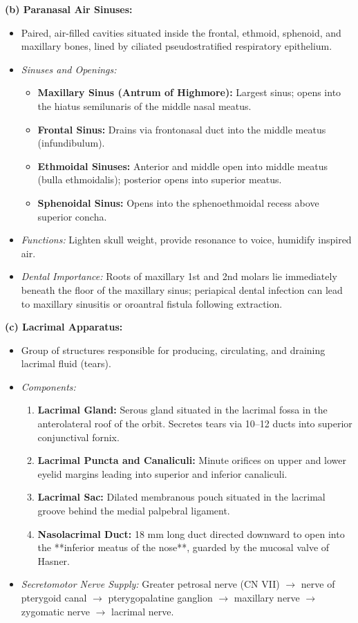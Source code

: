 \documentclass[11pt,a4paper]{article}
\begin{document}
\begin{ansbox}
\textbf{(b) Paranasal Air Sinuses:}
\begin{itemize}[leftmargin=*]
    \item Paired, air-filled cavities situated inside the frontal, ethmoid, sphenoid, and maxillary bones, lined by ciliated pseudostratified respiratory epithelium.
    \item \textit{Sinuses and Openings:}
    \begin{itemize}
        \item \textbf{Maxillary Sinus (Antrum of Highmore):} Largest sinus; opens into the hiatus semilunaris of the middle nasal meatus.
        \item \textbf{Frontal Sinus:} Drains via frontonasal duct into the middle meatus (infundibulum).
        \item \textbf{Ethmoidal Sinuses:} Anterior and middle open into middle meatus (bulla ethmoidalis); posterior opens into superior meatus.
        \item \textbf{Sphenoidal Sinus:} Opens into the sphenoethmoidal recess above superior concha.
    \end{itemize}
    \item \textit{Functions:} Lighten skull weight, provide resonance to voice, humidify inspired air.
    \item \textit{Dental Importance:} Roots of maxillary 1st and 2nd molars lie immediately beneath the floor of the maxillary sinus; periapical dental infection can lead to maxillary sinusitis or oroantral fistula following extraction.
\end{itemize}

\textbf{(c) Lacrimal Apparatus:}
\begin{itemize}[leftmargin=*]
    \item Group of structures responsible for producing, circulating, and draining lacrimal fluid (tears).
    \item \textit{Components:}
    \begin{enumerate}
        \item \textbf{Lacrimal Gland:} Serous gland situated in the lacrimal fossa in the anterolateral roof of the orbit. Secretes tears via 10--12 ducts into superior conjunctival fornix.
        \item \textbf{Lacrimal Puncta and Canaliculi:} Minute orifices on upper and lower eyelid margins leading into superior and inferior canaliculi.
        \item \textbf{Lacrimal Sac:} Dilated membranous pouch situated in the lacrimal groove behind the medial palpebral ligament.
        \item \textbf{Nasolacrimal Duct:} 18 mm long duct directed downward to open into the **inferior meatus of the nose**, guarded by the mucosal valve of Hasner.
    \end{enumerate}
    \item \textit{Secretomotor Nerve Supply:} Greater petrosal nerve (CN VII) $\rightarrow$ nerve of pterygoid canal $\rightarrow$ pterygopalatine ganglion $\rightarrow$ maxillary nerve $\rightarrow$ zygomatic nerve $\rightarrow$ lacrimal nerve.
\end{itemize}
\end{ansbox}
\end{document}
